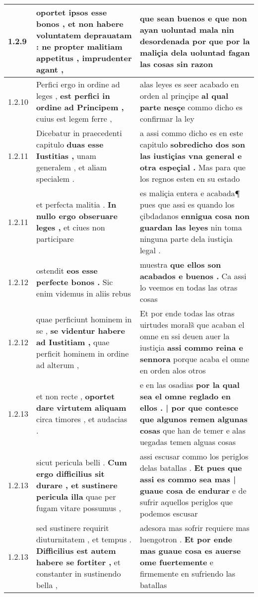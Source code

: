\begin{tabular}{|p{1cm}|p{6.5cm}|p{6.5cm}|}
1.2.9 & oportet ipsos esse bonos , \textbf{ et non habere voluntatem deprauatam : } ne propter malitiam appetitus , imprudenter agant , & que sean buenos \textbf{ e que non ayan uoluntad mala nin desordenada } por que por la maliçia dela uoluntad fagan las cosas sin razon \\\hline
1.2.10 & Perfici ergo in ordine ad leges , \textbf{ est perfici in ordine ad Principem , } cuius est legem ferre , & alas leyes es seer acabado en orden al prinçipe \textbf{ al qual parte nesçe } commo dicho es confirmar la ley \\\hline
1.2.11 & Dicebatur in praecedenti capitulo \textbf{ duas esse Iustitias , } unam generalem , et aliam specialem . & a assi commo dicho es en este capitulo \textbf{ sobredicho dos son las iustiçias vna general e otra espeçial . } Mas para que los regnos esten en su estado \\\hline
1.2.11 & et perfecta malitia . \textbf{ In nullo ergo obseruare leges , } et ciues non participare & es maliçia entera e acabada¶ pues que assi es quando los çibdadanos \textbf{ ennigua cosa non guardan las leyes } nin toma ninguna parte dela iustiçia legal . \\\hline
1.2.12 & ostendit \textbf{ eos esse perfecte bonos . } Sic enim videmus in aliis rebus & muestra \textbf{ que ellos son acabados e buenos . } Ca assi lo veemos en todas las otras cosas \\\hline
1.2.12 & quae perficiunt hominem in se , \textbf{ se videntur habere ad Iustitiam , } quae perficit hominem in ordine ad alterum , & Et por ende todas las otras uirtudes morałs̃ que acaban el omne en ssi deuen auer la iustiçia \textbf{ assi commo reina e sennora } porque acaba el omne en orden alos otros \\\hline
1.2.13 & et non recte , \textbf{ oportet dare virtutem aliquam } circa timores , et audacias . & e en las osadias \textbf{ por la qual sea el omne reglado en ellos . | por que contesce que algunos remen algunas cosas } que han de temer e alas uegadas temen alguas cosas \\\hline
1.2.13 & sicut pericula belli . \textbf{ Cum ergo difficilius sit durare , et sustinere pericula illa } quae per fugam vitare possumus , & assi escusar commo los periglos delas batallas . \textbf{ Et pues que assi es commo sea mas | guaue cosa de endurar } e de sufrir aquellos periglos que podemos escusar \\\hline
1.2.13 & sed sustinere requirit diuturnitatem , et tempus . \textbf{ Difficilius est autem habere se fortiter , } et constanter in sustinendo bella , & adesora mas sofrir requiere mas luengotron . \textbf{ Et por ende mas guaue cosa es auerse ome fuertemente } e firmemente en sufriendo las batallas \\\hline

\end{tabular}
